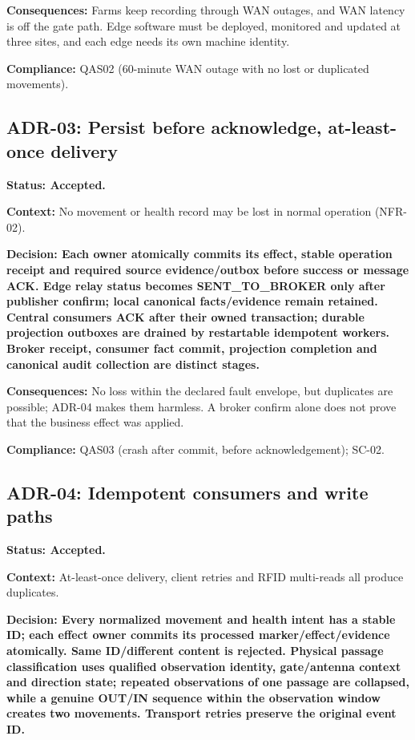 \textbf{Consequences:} Farms keep recording through WAN outages, and WAN
latency is off the gate path. Edge software must be deployed, monitored
and updated at three sites, and each edge needs its own machine
identity.

\textbf{Compliance:} QAS02 (60-minute WAN outage with no lost or
duplicated movements).

\subsection{ADR-03: Persist before acknowledge, at-least-once delivery}\label{adr:03}

\textbf{Status: Accepted.}

\textbf{Context:} No movement or health record may be lost in normal
operation (NFR-02).

\textbf{Decision: Each owner atomically commits its effect, stable
operation receipt and required source evidence/outbox before success or
message ACK. Edge relay status becomes SENT\_TO\_BROKER only after
publisher confirm; local canonical facts/evidence remain retained.
Central consumers ACK after their owned transaction; durable projection
outboxes are drained by restartable idempotent workers. Broker receipt,
consumer fact commit, projection completion and canonical audit
collection are distinct stages.}

\textbf{Consequences:} No loss within the declared fault envelope, but
duplicates are possible; ADR-04 makes them harmless. A broker confirm
alone does not prove that the business effect was applied.

\textbf{Compliance:} QAS03 (crash after commit, before acknowledgement);
SC-02.

\subsection{ADR-04: Idempotent consumers and write paths}\label{adr:04}

\textbf{Status: Accepted.}

\textbf{Context:} At-least-once delivery, client retries and RFID
multi-reads all produce duplicates.

\textbf{Decision: Every normalized movement and health intent has a
stable ID; each effect owner commits its processed
marker/effect/evidence atomically. Same ID/different content is
rejected. Physical passage classification uses qualified observation
identity, gate/antenna context and direction state; repeated
observations of one passage are collapsed, while a genuine OUT/IN
sequence within the observation window creates two movements. Transport
retries preserve the original event ID.}

